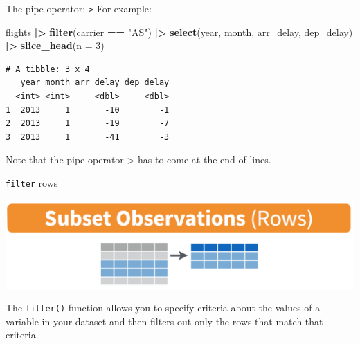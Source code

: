 \documentclass[
  ignorenonframetext,
]{beamer}
\newenvironment{Shaded}{\begin{snugshade}}{\end{snugshade}}
\newcommand{\AttributeTok}[1]{\textcolor[rgb]{0.13,0.29,0.53}{#1}}
\newcommand{\DecValTok}[1]{\textcolor[rgb]{0.00,0.00,0.81}{#1}}
\newcommand{\FunctionTok}[1]{\textcolor[rgb]{0.13,0.29,0.53}{\textbf{#1}}}
\newcommand{\NormalTok}[1]{#1}
\newcommand{\SpecialCharTok}[1]{\textcolor[rgb]{0.81,0.36,0.00}{\textbf{#1}}}
\newcommand{\StringTok}[1]{\textcolor[rgb]{0.31,0.60,0.02}{#1}}
\begin{document}
\begin{frame}[fragile]{The pipe operator:
\texttt{\textbar{}\textgreater{}}}
\protect\hypertarget{the-pipe-operator-3}{}
For example:

\normalsize

\begin{Shaded}
\begin{Highlighting}[]
\NormalTok{flights }\SpecialCharTok{|\textgreater{}} 
  \FunctionTok{filter}\NormalTok{(carrier }\SpecialCharTok{==} \StringTok{"AS"}\NormalTok{) }\SpecialCharTok{|\textgreater{}} 
  \FunctionTok{select}\NormalTok{(year, month, arr\_delay, dep\_delay) }\SpecialCharTok{|\textgreater{}} 
  \FunctionTok{slice\_head}\NormalTok{(}\AttributeTok{n =} \DecValTok{3}\NormalTok{)}
\end{Highlighting}
\end{Shaded}

\begin{verbatim}
# A tibble: 3 x 4
   year month arr_delay dep_delay
  <int> <int>     <dbl>     <dbl>
1  2013     1       -10        -1
2  2013     1       -19        -7
3  2013     1       -41        -3
\end{verbatim}

\normalsize

Note that the pipe operator \textbar\textgreater{} has to come at the
end of lines.
\end{frame}

\begin{frame}[fragile]{\texttt{filter} rows}
\protect\hypertarget{filter-rows}{}
\begin{center}\includegraphics[width=0.7\linewidth,height=0.4\textheight]{week3_1} \end{center}

The \texttt{filter()} function allows you to specify criteria about the
values of a variable in your dataset and then filters out only the rows
that match that criteria.
\end{frame}
\end{document}
